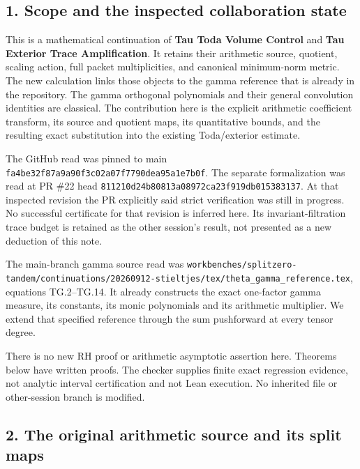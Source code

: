 \subsection{1. Scope and the inspected collaboration
state}\label{gamma_convolution:scope-and-the-inspected-collaboration-state}

This is a mathematical continuation of \textbf{Tau Toda Volume Control} and \textbf{Tau Exterior
Trace Amplification}. It retains their arithmetic source, quotient, scaling action, full packet
multiplicities, and canonical minimum-norm metric. The new calculation links those objects to the
gamma reference that is already in the repository. The gamma orthogonal polynomials and their
general convolution identities are classical. The contribution here is the explicit arithmetic
coefficient transform, its source and quotient maps, its quantitative bounds, and the resulting
exact substitution into the existing Toda/exterior estimate.

The GitHub read was pinned to main \nolinkurl{fa4be32f87a9a90f3c02a07f7790dea95a1e7b0f}. The separate
formalization was read at PR \#22 head \nolinkurl{811210d24b80813a08972ca23f919db015383137}. At that
inspected revision the PR explicitly said strict verification was still in progress. No successful
certificate for that revision is inferred here. Its invariant-filtration trace budget is retained as
the other session's result, not presented as a new deduction of this note.

The main-branch gamma source read was
\nolinkurl{workbenches/splitzero-tandem/continuations/20260912-stieltjes/tex/theta_gamma_reference.tex},
equations TG.2--TG.14. It already constructs the exact one-factor gamma measure, its constants, its
monic polynomials and its arithmetic multiplier. We extend that specified reference through the sum
pushforward at every tensor degree.

There is no new RH proof or arithmetic asymptotic assertion here. Theorems below have written
proofs. The checker supplies finite exact regression evidence, not analytic interval certification
and not Lean execution. No inherited file or other-session branch is modified.

\subsection{2. The original arithmetic source and its split
maps}\label{gamma_convolution:the-original-arithmetic-source-and-its-split-maps}

